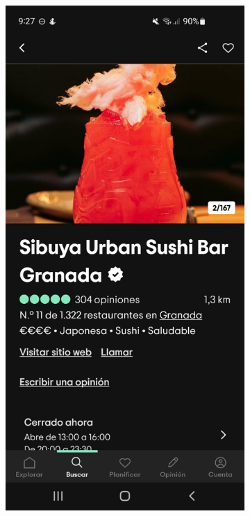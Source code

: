 \begin{figure}[H]
    \vspace{1em}

    \begin{subfigure}{.3\textwidth}
        \centering
        \includegraphics[width=\linewidth]{imagenes/TripAdvisor2.jpeg}

\end{subfigure}
\end{figure}
